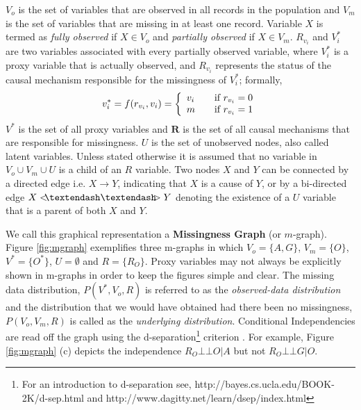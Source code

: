 \documentclass[12pt]{article}
\newcommand{\compos}{\mbox{$\bot\!\!\!\bot$}}
\begin{document}
$V_o $ is the set of variables that are observed in all records in the population and $V_m $ is the set of variables that are missing in at least one record.  Variable $X$ is termed as \textit{fully observed} if $X \in V_o$ and \textit{partially observed} if $X \in V_m$.  
$R_{v_i}$ and $V_i^*$ are two variables associated with every partially observed variable, where $V_i^*$ is a proxy variable that is actually observed, and $R_{v_i}$ represents the status of the causal mechanism responsible for the missingness of $V_i^*$; formally,
\begin{equation}    
v_i^*=f (r_{v_i},v_i)  = \left\{
\begin{array}{l l} \label{eq:miss1}
v_i & \quad \text{if }r_{v_i}=0\\
m & \quad \text{if }r_{v_i}=1\\
\end{array} \right. 
\end{equation}
$V^*$ is the set of all proxy variables and $\mathbf{R}$ is the set of all causal mechanisms that are responsible for missingness. $U$ is the set of unobserved nodes, also called latent variables. 
Unless stated otherwise it is assumed that no variable in $V_o \cup V_m \cup U$ is a child of an $R$ variable.  
Two nodes $X$ and $Y$ can be connected by a directed edge i.e. $X \to Y$, indicating that $X$ is a cause of $Y$, or by a bi-directed edge $X<\hspace*{-2mm}\textendash \textendash \hspace*{-2mm}>Y$ denoting the existence of a $U$ variable that is a parent of both $X$ and $Y$. %

We call this graphical representation a \textbf{Missingness Graph} (or $m$-graph). Figure \ref{fig:mgraph} exemplifies three m-graphs 
in which $V_o=\{A,G\}$, $V_m=\{O\}$, $V^*=\{O^*\}$, $U=\emptyset$ and $R=\{R_O\}$. Proxy variables may not always be explicitly shown in m-graphs in order to keep the figures simple and clear. 
The missing data distribution, $P(V^*,V_o,R)$ is referred to as the \textit{observed-data distribution}  and the distribution that we would have obtained had there been no missingness, $P(V_o,V_m,R)$ is called as the \textit{underlying distribution}. Conditional Independencies are read off the graph using the d-separation\footnote{For an introduction to d-separation see, http://bayes.cs.ucla.edu/BOOK-2K/d-sep.html and  http://www.dagitty.net/learn/dsep/index.html} criterion \citep{pearl}. For example, Figure \ref{fig:mgraph} (c)
depicts the independence $R_O \compos O|A$ but not $R_O \compos G|O$. %
\end{document}
